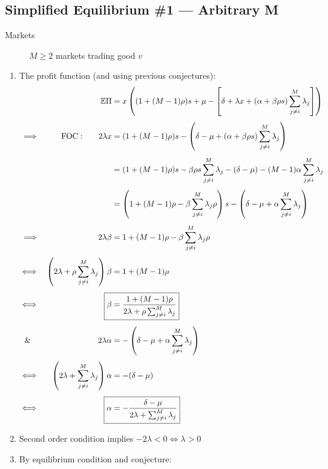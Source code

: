 \documentclass{scrartcl}
\newcommand{\rb}[1]{\ensuremath{\left(#1\right)}}
\newcommand{\sqb}[1]{\ensuremath{\left[#1\right]}}
\def\exp{\mathbb{E}}
\def\chil{\ensuremath{\rho}}
\begin{document}
			\subsection*{Simplified Equilibrium \#1 --- Arbitrary M}
			\begin{description}
				\item[Markets] $M \geq 2$ markets trading good $v$
			\end{description}
			\begin{enumerate}
				\item The profit function (and using previous conjectures):
				\begin{align*}
					        &&\exp \Pi                           &= x \rb{ (1 + (M-1)\chil)s + \mu - \sqb{ \delta + \lambda x + \rb{ \alpha + \beta \chil s }\sum_{j\neq i}^M \lambda_j } }\\[.4em]
					\implies&& \mathrm{FOC: }\qquad 2\lambda x   &= (1 + (M-1)\chil)s - \rb{ \delta - \mu + \rb{ \alpha + \beta \chil s }\sum_{j\neq i}^M \lambda_j  }\\[.4em]
					        &&                                   &= (1 + (M-1)\chil)s - \beta \chil s\sum_{j\neq i}^M \lambda_j  - (\delta - \mu ) - (M-1)\alpha\sum_{j\neq i}^M \lambda_j \\[.4em]
					        &&                                   &= \rb{{1 + (M-1)\chil  - \beta\sum_{j\neq i}^M \lambda_j}\chil } s - \rb{ \delta - \mu  + \alpha \sum_{j\neq i}^M \lambda_j }\\[.4em]
					\implies&& \qquad 2\lambda\beta              &= {1 + (M-1)\chil  - \beta\sum_{j\neq i}^M \lambda_j}\chil\\[.4em]
					\iff    && \rb{2 \lambda + \chil \sum_{j\neq i}^M \lambda_j } \beta    &= 1 + (M - 1)\chil\\[.4em]
					\iff    && \qquad \Aboxed{\beta              &= \frac{1 + (M-1)\chil}{2 \lambda + \chil \sum_{j\neq i}^M \lambda_j}}\\[.4em]
					\&\quad && 	2\lambda \alpha                  &= - \rb{ \delta - \mu + \alpha \sum_{j\neq i}^M \lambda_j }\\[.4em]
					\iff    && 	\rb{2\lambda + \sum_{j\neq i}^M \lambda_j}\alpha	 &= -(\delta - \mu )\\[.4em]
					\iff    && \qquad \Aboxed{\alpha		     &= -\frac{\delta - \mu }{2\lambda + \sum_{j\neq i}^M \lambda_j}}
				\end{align*}
				\item Second order condition implies $ -2 \lambda < 0 \iff \lambda > 0 $
				\item By equilibrium condition and conjecture:

\end{enumerate}
\end{document}

